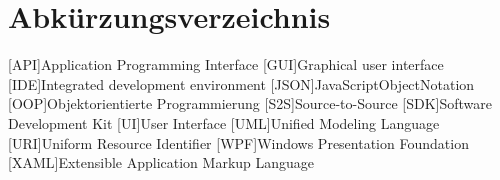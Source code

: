 \chapter{Abkürzungsverzeichnis}
\begin{acronym}[XAML]
[API]{Application Programming Interface}
[GUI]{Graphical user interface}
[IDE]{Integrated development environment}
[JSON]{JavaScriptObjectNotation}
[OOP]{Objektorientierte Programmierung}
[S2S]{Source-to-Source}
[SDK]{Software Development Kit}
[UI]{User Interface}
[UML]{Unified Modeling Language}
[URI]{Uniform Resource Identifier}
[WPF]{Windows Presentation Foundation}
[XAML]{Extensible Application Markup Language}

\end{acronym}
